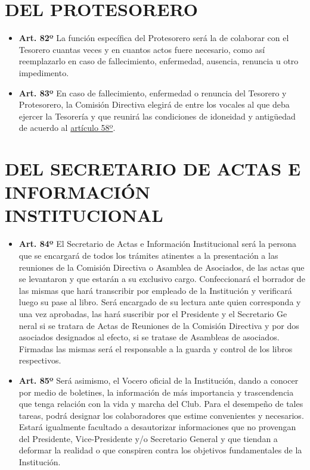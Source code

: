 \documentclass[]{book}
\providecommand{\tightlist}{%
  \setlength{\itemsep}{0pt}\setlength{\parskip}{0pt}}
\begin{document}
\chapter{DEL PROTESORERO}\label{cap14}

\begin{itemize}
\tightlist
\item
  \textbf{Art. 82º} La función específica del Protesorero será la de
  colaborar con el Tesorero cuantas veces y en cuantos actos fuere
  necesario, como así reemplazarlo en caso de fallecimiento, enfermedad,
  ausencia, renuncia u otro impedimento.
\end{itemize}

\begin{itemize}
\tightlist
\item
  \textbf{Art. 83º} En caso de fallecimiento, enfermedad o renuncia del
  Tesorero y Protesorero, la Comisión Directiva elegirá de entre los
  vocales al que deba ejercer la Tesorería y que reunirá las condiciones
  de idoneidad y antigüedad de acuerdo al
  \protect\hyperlink{art58}{artículo 58º}.
\end{itemize}

\chapter{DEL SECRETARIO DE ACTAS E INFORMACIÓN
INSTITUCIONAL}\label{cap15}

\begin{itemize}
\tightlist
\item
  \textbf{Art. 84º} El Secretario de Actas e Información Institucional
  será la persona que se encargará de todos los trámites atinentes a la
  presentación a las reuniones de la Comisión Directiva o Asamblea de
  Asociados, de las actas que se levantaron y que estarán a su exclusivo
  cargo. Confeccionará el borrador de las mismas que hará transcribir
  por empleado de la Institución y verificará luego su pase al libro.
  Será encargado de su lectura ante quien corresponda y una vez
  aprobadas, las hará suscribir por el Presidente y el Secretario Ge
  neral si se tratara de Actas de Reuniones de la Comisión Directiva y
  por dos asociados designados al efecto, si se tratase de Asambleas de
  asociados. Firmadas las mismas será el responsable a la guarda y
  control de los libros respectivos.
\end{itemize}

\begin{itemize}
\tightlist
\item
  \textbf{Art. 85º} Será asimismo, el Vocero oficial de la Institución,
  dando a conocer por medio de boletines, la información de más
  importancia y trascendencia que tenga relación con la vida y marcha
  del Club. Para el desempeño de tales tareas, podrá designar los
  colaboradores que estime convenientes y necesarios. Estará igualmente
  facultado a desautorizar informaciones que no provengan del
  Presidente, Vice-Presidente y/o Secretario General y que tiendan a
  deformar la realidad o que conspiren contra los objetivos
  fundamentales de la Institución.
\end{itemize}
\end{document}
